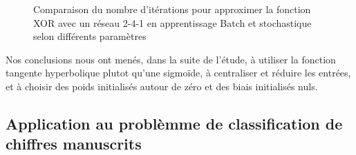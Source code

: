 \documentclass[
    10pt,
    a4paper,
    oneside,
    headinclude,footinclude,
    BCOR=5mm,
    captions=tableabove
]{scrartcl}
\begin{document}
\begin{figure}[H]
\centering
{}
\newline
{}
\caption{Comparaison du nombre d'itérations pour approximer la fonction XOR avec un réseau 2-4-1 en apprentissage Batch et stochastique selon différents paramètres}
\end{figure}

Nos conclusions nous ont menés, dans la suite de l'étude, à utiliser la fonction tangente hyperbolique plutot qu'une sigmoïde, à centraliser et réduire les entrées, et à choisir des poids initialisés autour de zéro et des biais initialisés nuls.

\subsection{Application au problèmme de classification de chiffres manuscrits}
\end{document}
